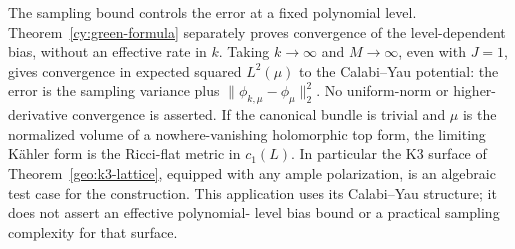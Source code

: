 The sampling bound controls the error at a fixed polynomial level.
Theorem~\ref{cy:green-formula} separately proves convergence of the
level-dependent bias, without an effective rate in $k$. Taking
$k\to\infty$ and $M\to\infty$, even with $J=1$, gives convergence
in expected squared $L^2(\mu)$ to the Calabi--Yau potential: the error
is the sampling variance plus $\|\phi_{k,\mu}-\phi_\mu\|_2^2$.
No uniform-norm or higher-derivative convergence is asserted.
If the canonical bundle is trivial and $\mu$ is the normalized volume
of a nowhere-vanishing holomorphic top form, the limiting K\"ahler
form is the Ricci-flat metric in $c_1(L)$. In particular the K3 surface
of Theorem~\ref{geo:k3-lattice}, equipped with any ample polarization,
is an algebraic test case for the construction. This application uses
its Calabi--Yau structure; it does not assert an effective polynomial-
level bias bound or a practical sampling complexity for that surface.
